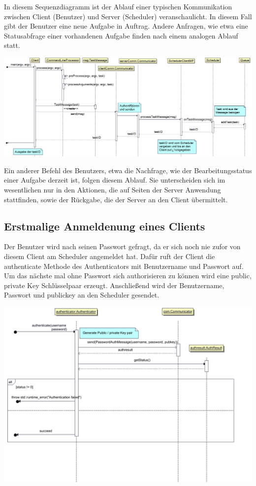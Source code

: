\documentclass[a4paper,12pt]{article}
\begin{document}
In diesem Sequenzdiagramm ist der Ablauf einer typischen Kommunikation zwischen Client (Benutzer) und Server (Scheduler) veranschaulicht. In diesem Fall gibt der Benutzer eine neue Aufgabe in Auftrag. Andere Anfragen, wie etwa eine Statusabfrage einer vorhandenen Aufgabe finden nach einem analogen Ablauf statt.

\includegraphics[width=\textwidth]{createTask}

Ein anderer Befehl des Benutzers, etwa die Nachfrage, wie der Bearbeitungsstatus einer Aufgabe derzeit ist, folgen diesem Ablauf. Sie unterscheiden sich im wesentlichen nur in den Aktionen, die auf Seiten der Server Anwendung stattfinden, sowie der Rückgabe, die der Server an den Client übermittelt.

\clearpage

\subsection{Erstmalige Anmeldenung eines Clients}

Der Benutzer wird nach seinen Passwort gefragt, da er sich noch nie zufor von diesem Client am Scheduler angemeldet hat. Dafür ruft der Client die authenticate Methode des Authenticators mit Benutzername und Passwort auf. Um das nächste mal ohne Passwort sich authorisieren zu können wird eine public, private Key Schlüsselpaar erzeugt. Anschließend wird der Benutzername, Passwort und publickey an den Scheduler gesendet.

\includegraphics[width=\textwidth]{Authenticator/ClientAuth}
\end{document}
